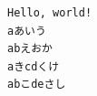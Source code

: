 \documentclass{ltjarticle}
\begin{document}
\begin{lstlisting}[gobble=4,columns=fixed,basewidth=1em,basicstyle=\ttfamily]
Hello, world!
aあいう
abえおか
aきcdくけ
abこdeさし
\end{lstlisting}
\end{document}
